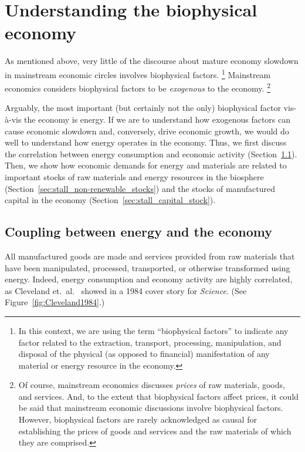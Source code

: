 \section{Understanding the biophysical economy}
\label{sec:exogenous_factors}

As mentioned above, 
very little of the discourse 
about mature economy slowdown 
in mainstream economic circles
involves biophysical factors.%
	\footnote{
	In this context, we are using the term ``biophysical factors''
	to indicate any factor related to 
	the extraction, transport, processing, manipulation, and disposal 
	of the physical (as opposed to financial) manifestation 
	of any material or energy resource in the economy.
	}
Mainstream economics considers biophysical factors
to be \emph{exogenous} to the economy.%
	\footnote{
	Of course, mainstream economics discusses \emph{prices}
	of raw materials, goods, and services. 
	And, to the extent that biophysical factors affect prices,
	it could be said that mainstream economic discussions involve
	biophysical factors.
	However, biophysical factors are rarely acknowledged as causal 
	for establishing the prices of goods and services and the raw materials 
	of which they are comprised.
	}

Arguably, the most important (but certainly not the only) biophysical factor 
vis-\`{a}-vis the economy is energy.
If we are to understand how exogenous factors can cause economic slowdown
and, conversely, drive economic growth,
we would do well to understand how energy operates in the economy.
Thus, we first discuss the correlation 
between energy consumption and economic activity 
(Section~\ref{sec:energy-economy_coupling}).
Then, we show how economic demands for energy and materials
are related to important stocks 
of raw materials and energy resources in the biosphere 
(Section~\ref{sec:stall_non-renewable_stocks})
and the stocks of manufactured capital in the economy
(Section~\ref{sec:stall_capital_stock}).


\subsection{Coupling between energy and the economy}
\label{sec:energy-economy_coupling}

All manufactured goods are made and services provided
from raw materials that have been
manipulated, processed, transported, or otherwise transformed using energy.
Indeed, energy consumption and economy activity are highly correlated,
as Cleveland et.\ al.~\cite{Cleveland:1984aa} showed in a 1984 cover story for \emph{Science}. 
(See Figure~\ref{fig:Cleveland1984}.)

